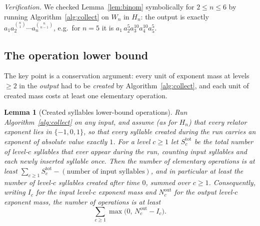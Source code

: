 \documentclass{amsart}
\newtheorem{lemma}{Lemma}
\theoremstyle{definition}
\begin{document}
\noindent
\emph{Verification.} We checked Lemma~\ref{lem:binom} symbolically for $2\le n\le 6$ by running
Algorithm~\ref{alg:collect} on $W_n$ in $H_n$: the output is exactly
$a_1 a_2^{\binom n1}\cdots a_n^{\binom n{n-1}}$, e.g.\ for $n=5$ it is
$a_1\,a_2^{5}a_3^{10}a_4^{10}a_5^{5}$.

\subsection*{The operation lower bound}
The key point is a conservation argument: every unit of exponent mass at levels $\ge2$ in the
\emph{output} had to be \emph{created} by Algorithm~\ref{alg:collect}, and each unit of created
mass costs at least one elementary operation.

\begin{lemma}[Created syllables lower-bound operations]\label{lem:opsmass}
Run Algorithm~\ref{alg:collect} on any input, and assume \textup{(}as for $H_n$\textup{)} that
\emph{every relator exponent lies in $\{-1,0,1\}$}, so that every syllable created during the
run carries an exponent of absolute value exactly $1$. For a level $c\ge1$ let $S_c^{\mathrm{tot}}$
be the total number of level-$c$ syllables that ever appear during the run, counting input
syllables and each newly inserted syllable once. Then the number of elementary operations is at
least $\sum_{c\ge1} S_c^{\mathrm{tot}}-(\text{number of input syllables})$, and in particular at
least the number of level-$c$ syllables created \emph{after} time $0$, summed over $c\ge1$.
Consequently, writing $I_c$ for the input level-$c$ exponent mass and $N_c^{\mathrm{out}}$ for
the output level-$c$ exponent mass, the number of operations is at least
\[
\sum_{c\ge1}\max\!\bigl(0,\,N_c^{\mathrm{out}}-I_c\bigr).
\]
\end{lemma}
\end{document}
